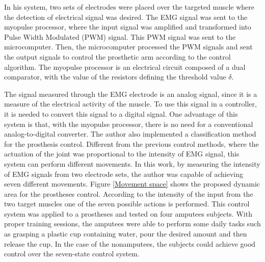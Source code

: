     In his system, two sets of electrodes were placed over the targeted muscle where the detection of electrical signal was desired. The EMG signal was sent to the myopulse processor, where the input signal was amplified and transformed into Pulse Width Modulated (PWM) signal. This PWM signal was sent to the microcomputer. Then, the microcomputer processed the PWM signals and sent the output signals to control the prosthetic arm according to the control algorithm. The myopulse processor is an electrical circuit composed of a dual comparator, with the value of the resistors defining the threshold value $\delta$.
    
    The signal measured through the EMG electrode is an analog signal, since it is a measure of the electrical activity of the muscle. To use this signal in a controller, it is needed to convert this signal to a digital signal.
    One advantage of this system is that, with the myopulse processor, there is no need for a conventional analog-to-digital converter. 
    The author also implemented a classification method for the prosthesis control. Different from the previous control methods, where the actuation of the joint was proportional to the intensity of EMG signal, this system can perform different movements. In this work, by measuring the intensity of EMG signals from two electrode sets, the author was capable of achieving seven different movements. Figure \ref{Movement space} shows the proposed dynamic area for the prostheses control. According to the intensity of the input from the two target muscles one of the seven possible actions is performed.
    This control system was applied to a prostheses and tested on four amputees subjects. With proper training sessions, the amputees were able to perform some daily tasks such as grasping a plastic cup containing water, pour the desired amount and then release the cup. In the case of the nonamputees, the subjects could achieve good control over the seven-state control system. 
    
